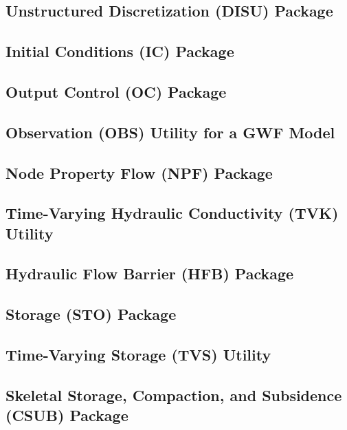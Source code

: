 \newpage
\subsection{Unstructured Discretization (DISU) Package}


\newpage
\subsection{Initial Conditions (IC) Package}


\newpage
\subsection{Output Control (OC) Package}


\newpage
\subsection{Observation (OBS) Utility for a GWF Model}


\newpage
\subsection{Node Property Flow (NPF) Package}


\newpage
\subsection{Time-Varying Hydraulic Conductivity (TVK) Utility}


\newpage
\subsection{Hydraulic Flow Barrier (HFB) Package}


\newpage
\subsection{Storage (STO) Package}


\newpage
\subsection{Time-Varying Storage (TVS) Utility}


\newpage
\subsection{Skeletal Storage, Compaction, and Subsidence (CSUB) Package}


